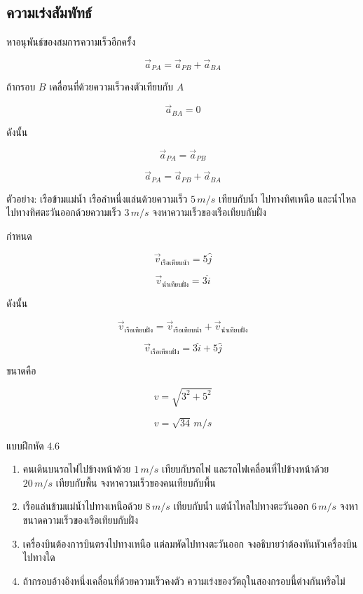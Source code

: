 \subsection{ความเร่งสัมพัทธ์}

หาอนุพันธ์ของสมการความเร็วอีกครั้ง

\[
\vec{a}_{PA}=\vec{a}_{PB}+\vec{a}_{BA}
\]

ถ้ากรอบ $B$ เคลื่อนที่ด้วยความเร็วคงตัวเทียบกับ $A$

\[
\vec{a}_{BA}=0
\]

ดังนั้น

\[
\vec{a}_{PA}=\vec{a}_{PB}
\]

\begin{tcolorbox}[title=สมการความเร่งสัมพัทธ์]
\[
\vec{a}_{PA}=\vec{a}_{PB}+\vec{a}_{BA}
\]
\end{tcolorbox}

\begin{examplebox}{ตัวอย่าง: เรือข้ามแม่น้ำ}
เรือลำหนึ่งแล่นด้วยความเร็ว $5\,\si{m/s}$ เทียบกับน้ำ ไปทางทิศเหนือ และน้ำไหลไปทางทิศตะวันออกด้วยความเร็ว $3\,\si{m/s}$ จงหาความเร็วของเรือเทียบกับฝั่ง

กำหนด

\[
\vec{v}_{\text{เรือเทียบน้ำ}}=5\hat{j}
\]

\[
\vec{v}_{\text{น้ำเทียบฝั่ง}}=3\hat{i}
\]

ดังนั้น

\[
\vec{v}_{\text{เรือเทียบฝั่ง}}
=
\vec{v}_{\text{เรือเทียบน้ำ}}
+
\vec{v}_{\text{น้ำเทียบฝั่ง}}
\]

\[
\vec{v}_{\text{เรือเทียบฝั่ง}}=3\hat{i}+5\hat{j}
\]

ขนาดคือ

\[
v=\sqrt{3^2+5^2}
\]

\[
v=\sqrt{34}\,\si{m/s}
\]
\end{examplebox}

\begin{exercisebox}{แบบฝึกหัด 4.6}
\begin{enumerate}
    \item คนเดินบนรถไฟไปข้างหน้าด้วย $1\,\si{m/s}$ เทียบกับรถไฟ และรถไฟเคลื่อนที่ไปข้างหน้าด้วย $20\,\si{m/s}$ เทียบกับพื้น จงหาความเร็วของคนเทียบกับพื้น
    \item เรือแล่นข้ามแม่น้ำไปทางเหนือด้วย $8\,\si{m/s}$ เทียบกับน้ำ แต่น้ำไหลไปทางตะวันออก $6\,\si{m/s}$ จงหาขนาดความเร็วของเรือเทียบกับฝั่ง
    \item เครื่องบินต้องการบินตรงไปทางเหนือ แต่ลมพัดไปทางตะวันออก จงอธิบายว่าต้องหันหัวเครื่องบินไปทางใด
    \item ถ้ากรอบอ้างอิงหนึ่งเคลื่อนที่ด้วยความเร็วคงตัว ความเร่งของวัตถุในสองกรอบนี้ต่างกันหรือไม่
\end{enumerate}
\end{exercisebox}

